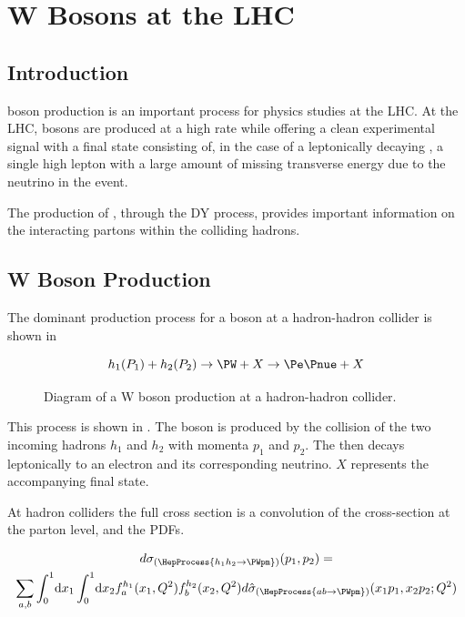 \chapter{W Bosons at the LHC}

\section{Introduction}

\PW boson production is an important process for physics studies at the LHC.  At
the \ac{LHC}, \PW bosons are produced at a high rate while offering a clean
experimental signal with a final state consisting of, in the case of a
leptonically decaying \PW, a single high \PT lepton with a large amount of
missing transverse energy due to the neutrino in the event. 

The production of \PW, through the \ac{DY} process, provides important
information on the interacting partons within the colliding hadrons.

\section{W Boson Production}

The dominant production process for a \PW boson at a hadron-hadron collider is
shown in 

\begin{equation}
  h_1(P_1) + h_2(P_2)
  \to 
  \PW + X
  \to
  \Pe \Pnue + X
  \label{wbos:wprod}
\end{equation}

\begin{figure}[htb]
  \centering
  \caption{Diagram of a W boson production at a hadron-hadron collider.}
  \label{wbos:wproddiag}
\end{figure}

This process is shown in . 
The \PW boson is produced by the collision of the two incoming hadrons $h_1$
and $h_2$ with momenta $p_1$ and $p_2$. The \PW then decays leptonically to an
electron and its corresponding neutrino. $X$ represents the accompanying final
state.

At hadron colliders the full cross section is a convolution of the cross-section
at the parton level, and the \acp{PDF}.

\begin{multline}
  d\sigma_{(\HepProcess{h_1 h_2 \to \PWpm})}(p_1,p_2) = \\
  \sum\limits_{a,b}
  \int_0^1 \! \mathrm{d} x_1 
  \int_0^1 \! \mathrm{d} x_2 
  f_a^{h_1}(x_1,Q^2)
  f_b^{h_2}(x_2,Q^2) 
  d\hat{\sigma}_{(\HepProcess{a b \to \PWpm})}(x_1 p_1, x_2 p_2; Q^2)
  \label{wbos:xsec}
\end{multline}

